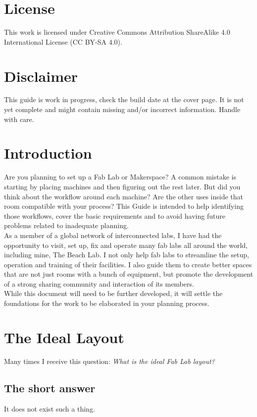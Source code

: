 \documentclass[a4paper,12pt,titlepage]{article}
\begin{document}
\section*{License}
This work is licensed under Creative Commons Attribution ShareAlike 4.0 International License (CC BY-SA 4.0). 

\section*{Disclaimer}
This guide is work in progress, check the build date at the cover page. It is not yet complete and might contain missing and/or incorrect information. Handle with care.
\clearpage
\section{Introduction}
Are you planning to set up a Fab Lab or Makerspace? A common mistake is starting by placing machines and then figuring out the rest later. But did you think about the workflow around each machine? Are the other uses inside that room compatible with your process?  This Guide is intended to help identifying those workflows, cover the basic requirements and to avoid having future problems related to inadequate planning.\\

As a member of a global network of interconnected labs, I have had the opportunity to
visit, set up, fix and operate many fab labs all around the world, including mine, The Beach Lab. I not
only help fab labs to streamline the setup, operation and training of their facilities. I also
guide them to create better spaces that are not just rooms with a bunch of equipment, but
promote the development of a strong sharing community and interaction of its members.\\

While this document will need to be further
developed, it will settle the foundations for the work to be elaborated in your planning process.



\section{The Ideal Layout}
Many times I receive this question: \textit{What is the ideal Fab Lab layout?}
\subsection{The short answer} 
It does not exist such a thing.
\end{document}
